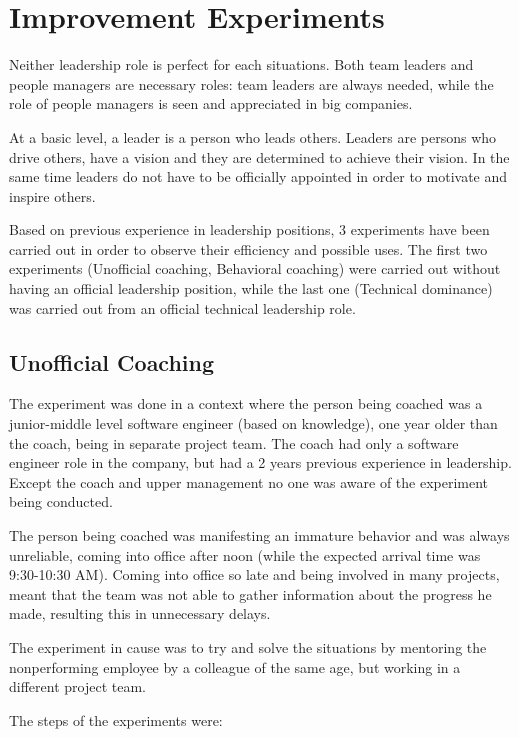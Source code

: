 \chapter{Improvement Experiments}
\label{chapter:improvement}
Neither leadership role is perfect for each situations. Both team leaders and people managers are necessary roles: team leaders are always needed, while the role of people managers is seen and appreciated in big companies.

At a basic level, a leader is a person who leads others. Leaders are persons who drive others, have a vision and they are determined to achieve their vision. In the same time leaders do not have to be officially appointed in order to motivate and inspire others.

Based on previous experience in leadership positions, 3 experiments have been carried out in order to observe their efficiency and possible uses. The first two experiments (Unofficial coaching, Behavioral coaching) were carried out without having an official leadership position, while the last one (Technical dominance) was carried out from an official technical leadership role.

\section{Unofficial Coaching}
\label{sec:un-coach}

The experiment was done in a context where the person being coached was a junior-middle level software engineer (based on knowledge), one year older than the coach, being in separate project team. The coach had only a software engineer role in the company, but had a 2 years previous experience in leadership. Except the coach and upper management no one was aware of the experiment being conducted.

The person being coached was manifesting an immature behavior and was always unreliable, coming into office after noon (while the expected arrival time was 9:30-10:30 AM). Coming into office so late and being involved in many projects, meant that the team was not able to gather information about the progress he made, resulting this in unnecessary delays. 

The experiment in cause was to try and solve the situations by mentoring the nonperforming employee by a colleague of the same age, but working in a different project team.

The steps of the experiments were:


